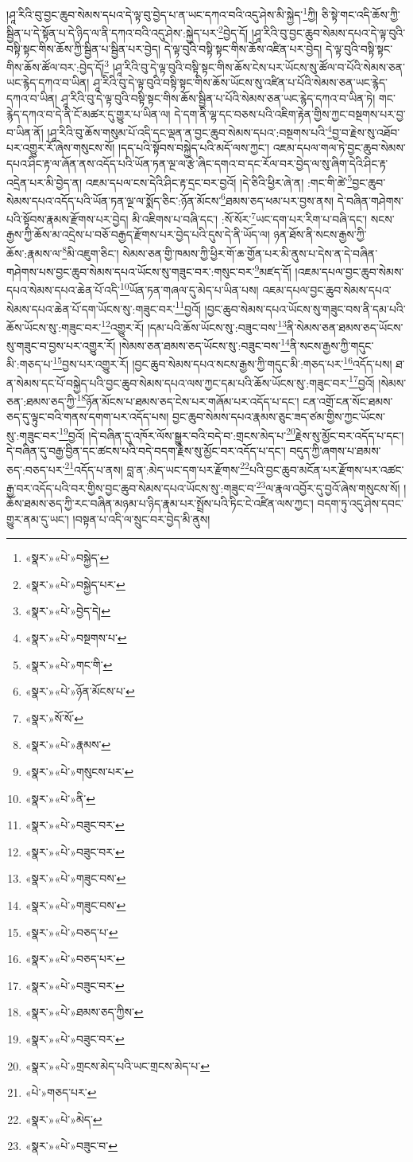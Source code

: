 །ཤཱ་རིའི་བུ་བྱང་ཆུབ་སེམས་དཔའ་དེ་ལྟ་བུ་བྱེད་པ་ན་ཡང་དཀའ་བའི་འདུ་ཤེས་མི་སྐྱེད་\footnote{«སྣར་»«པེ་»བསྐྱེད་}ཀྱི། ཅི་སྟེ་གང་འདི་ཆོས་ཀྱི་སྦྱིན་པ་དེ་སྟོན་པ་དེ་ཉིད་ལ་ནི་དཀའ་བའི་འདུ་ཤེས་:སྐྱེད་པར་\footnote{«སྣར་»«པེ་»བསྐྱེད་པར་}བྱེད་དོ། །ཤཱ་རིའི་བུ་བྱང་ཆུབ་སེམས་དཔའ་དེ་ལྟ་བུའི་བསྟི་སྟང་གིས་ཆོས་ཀྱི་སྦྱིན་པ་སྦྱིན་པར་བྱེད། དེ་ལྟ་བུའི་བསྟི་སྟང་གིས་ཆོས་འཛིན་པར་བྱེད། དེ་ལྟ་བུའི་བསྟི་སྟང་གིས་ཆོས་ཚོལ་བར་:བྱེད་དོ།\footnote{«སྣར་»«པེ་»བྱེད་དེ།} །ཤཱ་རིའི་བུ་དེ་ལྟ་བུའི་བསྟི་སྟང་གིས་ཆོས་ངེས་པར་ཡོངས་སུ་ཚོལ་བ་པོའི་སེམས་ཅན་ཡང་རྙེད་དཀའ་བ་ཡིན། ཤཱ་རིའི་བུ་དེ་ལྟ་བུའི་བསྟི་སྟང་གིས་ཆོས་ཡོངས་སུ་འཛིན་པ་པོའི་སེམས་ཅན་ཡང་རྙེད་དཀའ་བ་ཡིན། ཤཱ་རིའི་བུ་དེ་ལྟ་བུའི་བསྟི་སྟང་གིས་ཆོས་སྦྱིན་པ་པོའི་སེམས་ཅན་ཡང་རྙེད་དཀའ་བ་ཡིན་ཏེ། གང་རྙེད་དཀའ་བ་དེ་ནི་ངོ་མཚར་དུ་གྱུར་པ་ཡིན་ལ། དེ་དག་ནི་ལྷ་དང་བཅས་པའི་འཇིག་རྟེན་གྱིས་ཀྱང་བསྔགས་པར་བྱ་བ་ཡིན་ནོ། །ཤཱ་རིའི་བུ་ཆོས་གསུམ་པོ་འདི་དང་ལྡན་ན་བྱང་ཆུབ་སེམས་དཔའ་:བསྔགས་པའི་\footnote{«སྣར་»«པེ་»བསྔགས་པ་}བྱ་བ་རྗེས་སུ་འཐོབ་པར་འགྱུར་རོ་ཞེས་གསུངས་སོ། །དད་པའི་སྟོབས་བསྐྱེད་པའི་མདོ་ལས་ཀྱང་། འཇམ་དཔལ་གལ་ཏེ་བྱང་ཆུབ་སེམས་དཔའ་ཤིང་རྟ་ལ་ཞོན་ནས་འདོད་པའི་ཡོན་ཏན་ལྔ་ལ་རྩེ་ཞིང་དགའ་བ་དང་རོལ་བར་བྱེད་ལ་སུ་ཞིག་དེའི་ཤིང་རྟ་འདྲེན་པར་མི་བྱེད་ན། འཇམ་དཔལ་ངས་དེའི་ཤིང་རྟ་དྲང་བར་བྱའོ། །དེ་ཅིའི་ཕྱིར་ཞེ་ན། :གང་གི་ཚེ་\footnote{«སྣར་»«པེ་»གང་གི་}བྱང་ཆུབ་སེམས་དཔའ་འདོད་པའི་ཡོན་ཏན་ལྔ་ལ་སྨོད་ཅིང་:ཉོན་མོངས་\footnote{«སྣར་»«པེ་»ཉོན་མོངས་པ་}ཐམས་ཅད་ཕམ་པར་བྱས་ནས། དེ་བཞིན་གཤེགས་པའི་སྟོབས་རྣམས་རྫོགས་པར་བྱེད། མི་འཇིགས་པ་བཞི་དང་། :སོ་སོར་\footnote{«སྣར་»སོ་སོ་}ཡང་དག་པར་རིག་པ་བཞི་དང་། སངས་རྒྱས་ཀྱི་ཆོས་མ་འདྲེས་པ་བཅོ་བརྒྱད་རྫོགས་པར་བྱེད་པའི་དུས་དེ་ནི་ཡོད་ལ། ཉན་ཐོས་ནི་སངས་རྒྱས་ཀྱི་ཆོས་:རྣམས་ལ་\footnote{«སྣར་»«པེ་»རྣམས་}མི་འཇུག་ཅིང་། སེམས་ཅན་གྱི་ཁམས་ཀྱི་ཕྱིར་གོ་ཆ་གྱོན་པར་མི་ནུས་པ་དེས་ན་དེ་བཞིན་གཤེགས་པས་བྱང་ཆུབ་སེམས་དཔའ་ཡོངས་སུ་གཟུང་བར་:གསུང་བར་\footnote{«སྣར་»«པེ་»གསུངས་པར་}མཛད་དོ། །འཇམ་དཔལ་བྱང་ཆུབ་སེམས་དཔའ་སེམས་དཔའ་ཆེན་པོ་འདི་\footnote{«སྣར་»«པེ་»ནི་}ཡོན་ཏན་གཞལ་དུ་མེད་པ་ཡིན་པས། འཇམ་དཔལ་བྱང་ཆུབ་སེམས་དཔའ་སེམས་དཔའ་ཆེན་པོ་དག་ཡོངས་སུ་:གཟུང་བར་\footnote{«སྣར་»«པེ་»བཟུང་བར་}བྱའོ། །བྱང་ཆུབ་སེམས་དཔའ་ཡོངས་སུ་གཟུང་བས་ནི་དམ་པའི་ཆོས་ཡོངས་སུ་:གཟུང་བར་\footnote{«སྣར་»«པེ་»བཟུང་བར་}འགྱུར་རོ། །དམ་པའི་ཆོས་ཡོངས་སུ་:བཟུང་བས་\footnote{«སྣར་»«པེ་»གཟུང་བས་}ནི་སེམས་ཅན་ཐམས་ཅད་ཡོངས་སུ་གཟུང་བ་བྱས་པར་འགྱུར་རོ། །སེམས་ཅན་ཐམས་ཅད་ཡོངས་སུ་:བཟུང་བས་\footnote{«སྣར་»«པེ་»གཟུང་བས་}ནི་སངས་རྒྱས་ཀྱི་གདུང་མི་:གཅད་པ་\footnote{«སྣར་»«པེ་»བཅད་པ་}བྱས་པར་འགྱུར་རོ། །བྱང་ཆུབ་སེམས་དཔའ་སངས་རྒྱས་ཀྱི་གདུང་མི་:གཅད་པར་\footnote{«སྣར་»«པེ་»བཅད་པར་}འདོད་པས། ཐ་ན་སེམས་དང་པོ་བསྐྱེད་པའི་བྱང་ཆུབ་སེམས་དཔའ་ལས་ཀྱང་དམ་པའི་ཆོས་ཡོངས་སུ་:གཟུང་བར་\footnote{«སྣར་»«པེ་»བཟུང་བར་}བྱའོ། །སེམས་ཅན་:ཐམས་ཅད་ཀྱི་\footnote{«སྣར་»«པེ་»ཐམས་ཅད་ཀྱིས་}ཉོན་མོངས་པ་ཐམས་ཅད་ངེས་པར་གཞོམ་པར་འདོད་པ་དང་། ངན་འགྲོ་ངན་སོང་ཐམས་ཅད་དུ་ལྟུང་བའི་གནས་དགག་པར་འདོད་པས། བྱང་ཆུབ་སེམས་དཔའ་རྣམས་ཅུང་ཟད་ཙམ་གྱིས་ཀྱང་ཡོངས་སུ་:གཟུང་བར་\footnote{«སྣར་»«པེ་»བཟུང་བར་}བྱའོ། །དེ་བཞིན་དུ་འཁོར་ལོས་སྒྱུར་བའི་བདེ་བ་:གྲངས་མེད་པ་\footnote{«སྣར་»«པེ་»གྲངས་མེད་པའི་ཡང་གྲངས་མེད་པ་}རྗེས་སུ་མྱོང་བར་འདོད་པ་དང་། དེ་བཞིན་དུ་བརྒྱ་བྱིན་དང་ཚངས་པའི་བདེ་བདག་རྗེས་སུ་མྱོང་བར་འདོད་པ་དང་། བདུད་ཀྱི་ཞགས་པ་ཐམས་ཅད་:བཅད་པར་\footnote{«པེ་»གཅད་པར་}འདོད་པ་ནས། བླ་ན་:མེད་ཡང་དག་པར་རྫོགས་\footnote{«སྣར་»«པེ་»མེད་}པའི་བྱང་ཆུབ་མངོན་པར་རྫོགས་པར་འཚང་རྒྱ་བར་འདོད་པའི་བར་གྱིས་བྱང་ཆུབ་སེམས་དཔའ་ཡོངས་སུ་:གཟུང་བ་\footnote{«སྣར་»«པེ་»བཟུང་བ་}ལ་རྣལ་འབྱོར་དུ་བྱའོ་ཞེས་གསུངས་སོ། །ཆོས་ཐམས་ཅད་ཀྱི་རང་བཞིན་མཉམ་པ་ཉིད་རྣམ་པར་སྤྲོས་པའི་ཏིང་ངེ་འཛིན་ལས་ཀྱང་། བདག་ཏུ་འདུ་ཤེས་དབང་གྱུར་ནམ་དུ་ཡང་། །བསྟན་པ་འདི་ལ་སྲུང་བར་བྱེད་མི་ནུས། 